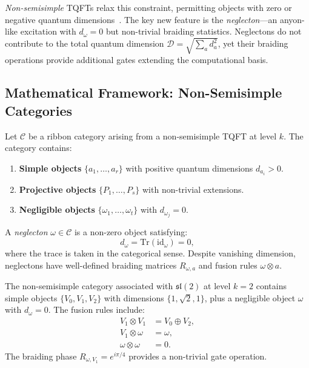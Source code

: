 \emph{Non-semisimple} TQFTs relax this constraint, permitting objects
with zero or negative quantum dimensions~\cite{Rowell2021,Gainutdinov2020}.
The key new feature is the \emph{neglecton}—an anyon-like excitation with
$d_\omega = 0$ but non-trivial braiding statistics. Neglectons do not
contribute to the total quantum dimension $\mathcal{D} = \sqrt{\sum_a d_a^2}$,
yet their braiding operations provide additional gates extending the
computational basis.

\subsection{Mathematical Framework: Non-Semisimple Categories}

Let $\mathcal{C}$ be a ribbon category arising from a non-semisimple TQFT
at level $k$. The category contains:

\begin{enumerate}
\item \textbf{Simple objects} $\{a_1, \ldots, a_r\}$ with positive quantum
dimensions $d_{a_i} > 0$.
\item \textbf{Projective objects} $\{P_1, \ldots, P_s\}$ with non-trivial
extensions.
\item \textbf{Negligible objects} $\{\omega_1, \ldots, \omega_t\}$ with
$d_{\omega_j} = 0$.
\end{enumerate}

\begin{definition}[Neglecton]
\label{def:neglecton}
A \emph{neglecton} $\omega \in \mathcal{C}$ is a non-zero object satisfying:
\begin{equation}
d_\omega = \mathrm{Tr}(\mathrm{id}_\omega) = 0,
\label{eq:neglecton_dim}
\end{equation}
where the trace is taken in the categorical sense. Despite vanishing
dimension, neglectons have well-defined braiding matrices
$R_{\omega, a}$ and fusion rules $\omega \otimes a$.
\end{definition}

\begin{example}[$(s\ell(2), k=2)$ Category]
\label{ex:sl2}
The non-semisimple category associated with $\mathfrak{sl}(2)$ at level
$k = 2$ contains simple objects $\{V_0, V_1, V_2\}$ with dimensions
$\{1, \sqrt{2}, 1\}$, plus a negligible object $\omega$ with $d_\omega = 0$.
The fusion rules include:
\begin{align}
V_1 \otimes V_1 &= V_0 \oplus V_2, \\
V_1 \otimes \omega &= \omega, \\
\omega \otimes \omega &= 0.
\end{align}
The braiding phase $R_{\omega, V_1} = e^{i\pi/4}$ provides a non-trivial
gate operation.
\end{example}

